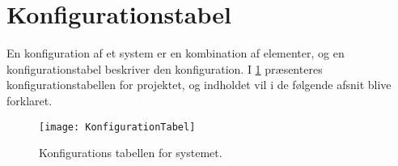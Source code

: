 \section{Konfigurationstabel}\label{konfigurationstabel}
En konfiguration af et system er en kombination af elementer, og en konfigurationstabel beskriver den konfiguration.
I \cref{tab:konfigurationsTabel} præsenteres konfigurationstabellen for projektet, og indholdet vil i de følgende afsnit blive forklaret.

\begin{figure}
\texttt{[image: KonfigurationTabel]}
\caption{Konfigurations tabellen for systemet.}
\label{tab:konfigurationsTabel}
\end{figure}
